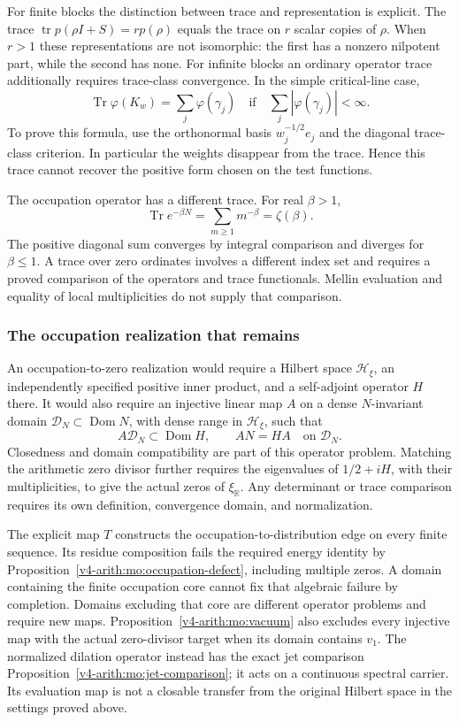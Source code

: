 For finite blocks the distinction between trace and representation
is explicit. The trace $\operatorname{tr}p(\rho I+S)=rp(\rho)$
equals the trace on $r$ scalar copies of $\rho$.
When $r>1$ these representations are not isomorphic: the first has
a nonzero nilpotent part, while the second has none.
For infinite blocks an ordinary operator trace additionally requires
trace-class convergence. In the simple critical-line case,
\[
 \operatorname{Tr}\varphi(K_w)=\sum_j\varphi(\gamma_j)
 \quad\text{if}\quad \sum_j|\varphi(\gamma_j)|<\infty.
\]
To prove this formula, use the orthonormal basis
$w_j^{-1/2}e_j$ and the diagonal trace-class criterion.
In particular the weights disappear from the trace.
Hence this trace cannot recover the positive form chosen on
the test functions.

The occupation operator has a different trace. For real $\beta>1$,
\[
 \operatorname{Tr}e^{-\beta N}=\sum_{m\geq1}m^{-\beta}
 =\zeta(\beta).
\]
The positive diagonal sum converges by integral comparison and
diverges for $\beta\leq1$. A trace over zero ordinates involves
a different index set and requires a proved comparison of the
operators and trace functionals. Mellin evaluation and equality
of local multiplicities do not supply that comparison.

\subsubsection{The occupation realization that remains}

An occupation-to-zero realization would require a Hilbert space
$\mathscr H_\xi$, an independently specified positive inner product,
and a self-adjoint operator $H$ there. It would also require an
injective linear map $A$ on a dense $N$-invariant domain
$\mathscr D_N\subset\operatorname{Dom}N$, with dense range in
$\mathscr H_\xi$, such that
\[
 A\mathscr D_N\subset\operatorname{Dom}H,\qquad
 AN=HA\quad\text{on }\mathscr D_N.
\]
Closedness and domain compatibility are part of this operator
problem. Matching the arithmetic zero divisor further requires
the eigenvalues of $1/2+iH$, with their multiplicities, to give
the actual zeros of $\xi_{\mathbb R}$. Any determinant or trace
comparison requires its own definition, convergence domain, and
normalization.

The explicit map $T$ constructs the occupation-to-distribution
edge on every finite sequence. Its residue composition fails the
required energy identity by Proposition~\ref{v4-arith:mo:occupation-defect}, including
multiple zeros. A domain containing the finite occupation core
cannot fix that algebraic failure by completion. Domains excluding
that core are different operator problems and require new maps.
Proposition~\ref{v4-arith:mo:vacuum} also excludes every injective map
with the actual zero-divisor target when its domain contains $v_1$.
The normalized dilation operator instead has the exact jet
comparison Proposition~\ref{v4-arith:mo:jet-comparison}; it acts on a continuous
spectral carrier. Its evaluation map is not a closable transfer
from the original Hilbert space in the settings proved above.

